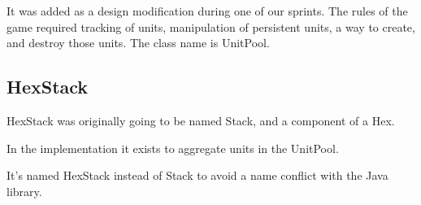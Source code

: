 \documentclass[12pt,a4paper]{article}
\begin{document}
It was added as a design modification during one of our sprints. The rules of the game required tracking of units, manipulation of persistent units, a way to create, and destroy those units. The class name is UnitPool.

\subsection{HexStack}
HexStack was originally going to be named Stack, and a component of a Hex.

In the implementation it exists to aggregate units in the UnitPool.

It's named HexStack instead of Stack to avoid a name conflict with the Java library.
\end{document}
